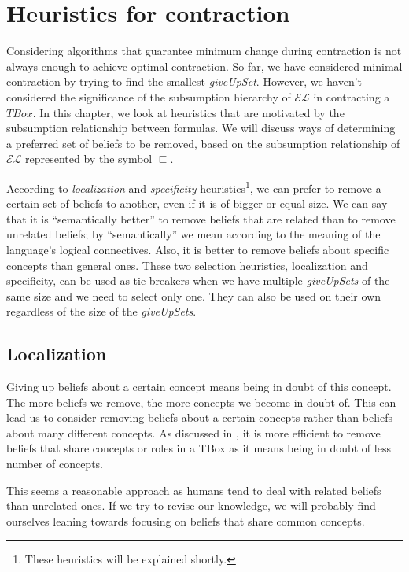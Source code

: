 \chapter{Heuristics for contraction}
Considering algorithms that guarantee minimum change during contraction is not always enough to achieve optimal contraction. So far, we have considered minimal contraction by trying to find the smallest \textit{giveUpSet}. However, we haven't considered the significance of the subsumption hierarchy of $\mathcal{EL}$ in contracting a $TBox$. In this chapter, we look at heuristics that are motivated by the subsumption relationship between formulas. We will discuss ways of determining a preferred set of beliefs to be removed, based on the subsumption relationship of $\mathcal{EL}$ represented by the symbol $\sqsubseteq$. 

According to \textit{localization} and \textit{specificity} heuristics\footnote{These heuristics will be explained shortly.}, we can prefer to remove a certain set of beliefs to another, even if it is of bigger or equal size. We can say that it is ``semantically better'' to remove beliefs that are related than to remove unrelated beliefs; by ``semantically'' we mean according to the meaning of the language's logical connectives. Also, it is better to remove beliefs about specific concepts than general ones. These two selection heuristics, localization and specificity, can be used as tie-breakers when we have multiple \textit{giveUpSets} of the same size and we need to select only one. They can also be used on their own regardless of the size of the \textit{giveUpSets}.

\section{Localization}
Giving up beliefs about a certain concept means being in doubt of this concept. The more beliefs we remove, the more concepts we become in doubt of. This can lead us to consider removing beliefs about a certain concepts rather than beliefs about many different concepts. As discussed in \cite{zwei}, it is more efficient to remove beliefs that share concepts or roles in a TBox as it means being in doubt of less number of concepts.

This seems a reasonable approach as humans tend to deal with related beliefs than unrelated ones. If we try to revise our knowledge, we will probably find ourselves leaning towards focusing on beliefs that share common concepts. 

